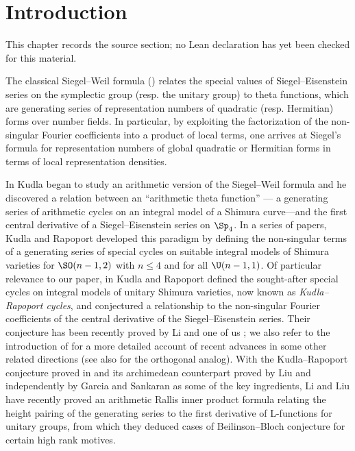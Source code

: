 \chapter{Introduction}
\label{higher-siegel-weil-unitary-nonsingular-terms-chapter-01}

\begin{remark}
\label{higher-siegel-weil-unitary-nonsingular-terms-chapter-01-source}
This chapter records the source section; no Lean declaration has yet been checked for this material.
\notready
\end{remark}

The classical Siegel--Weil formula (\cite{Siegel1951,Weil1965}) relates the special values  of Siegel--Eisenstein series on the symplectic group (resp. the unitary group) to theta functions, which are generating series of representation numbers of quadratic (resp. Hermitian) forms over number fields. In particular, by exploiting the factorization of the non-singular Fourier coefficients into a product of local terms, one arrives at Siegel's formula for representation numbers of global quadratic or Hermitian forms in terms of local representation densities.

In \cite{Kudla1997} Kudla began to study an arithmetic version of the Siegel--Weil formula and he discovered a relation between an ``arithmetic theta function'' --- a generating series of arithmetic cycles on an integral model of a Shimura curve---and the  first central derivative of a Siegel--Eisenstein series on $\Sp_4$. In a series of papers, Kudla and Rapoport developed this paradigm by defining the non-singular terms of a generating series of special cycles on suitable integral models of Shimura varieties for $\SO(n-1,2)$ with $n\leq 4$ and for all $\U(n-1,1)$. Of particular relevance to our paper, in \cite{KRI,KRII} Kudla and Rapoport defined the sought-after special cycles on integral models of unitary Shimura varieties, now known as \emph{Kudla--Rapoport cycles}, and conjectured a relationship to the non-singular Fourier coefficients  of the central derivative of the Siegel--Eisenstein series.  Their conjecture has been recently proved by Li and one of us \cite{LZ1}; we also refer to the introduction of \cite{LZ1} for a more detailed account of recent advances in some other related directions (see also \cite{LZ2} for the orthogonal analog). With the Kudla--Rapoport  conjecture proved in \cite{LZ1} and its archimedean counterpart proved by Liu \cite{Liu11}  and independently by Garcia and Sankaran \cite{GS19} as some of the key ingredients, Li and Liu \cite{LL1,LL2} have recently proved an arithmetic Rallis inner product formula relating the height pairing of the generating series to the first derivative of L-functions for unitary groups, from which they deduced cases of Beilinson--Bloch conjecture for certain high rank motives.

